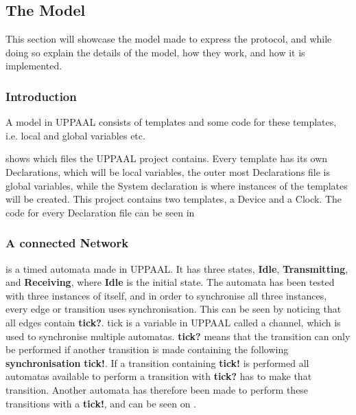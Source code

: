 \subsection{The Model}
This section will showcase the model made to express the protocol, and while doing so explain the details of the model, how they work, and how it is implemented.

\subsubsection{Introduction}
A model in UPPAAL consists of templates and some code for these templates, i.e. local and global variables etc.


 shows which files the UPPAAL project contains. 
Every template has its own Declarations, which will be local variables, the outer most Declarations file is global variables, while the System declaration is where instances of the templates will be created.
This project contains two templates, a Device and a Clock.
The code for every Declaration file can be seen in 

\subsubsection{A connected Network}

 is a timed automata made in UPPAAL.
It has three states, \textbf{Idle}, \textbf{Transmitting}, and \textbf{Receiving}, where \textbf{Idle} is the initial state.
The automata has been tested with three instances of itself, and in order to synchronise all three instances, every edge or transition uses synchronisation.
This can be seen by noticing that all edges contain \textbf{tick?}. 
tick is a variable in UPPAAL called a channel, which is used to synchronise multiple automatas.
\textbf{tick?} means that the transition can only be performed if another transition is made containing the following \textbf{synchronisation} \textbf{tick!}.
If a transition containing \textbf{tick!} is performed all automatas available to perform a transition with \textbf{tick?} has to make that transition.
Another automata has therefore been made to perform these transitions with a \textbf{tick!}, and can be seen on .

